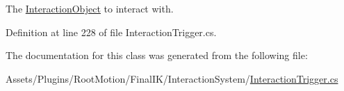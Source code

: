 The \mbox{\hyperlink{class_root_motion_1_1_final_i_k_1_1_interaction_object}{Interaction\+Object}} to interact with. 



Definition at line 228 of file Interaction\+Trigger.\+cs.



The documentation for this class was generated from the following file\+:\begin{DoxyCompactItemize}
\item 
Assets/\+Plugins/\+Root\+Motion/\+Final\+I\+K/\+Interaction\+System/\mbox{\hyperlink{_interaction_trigger_8cs}{Interaction\+Trigger.\+cs}}\end{DoxyCompactItemize}
